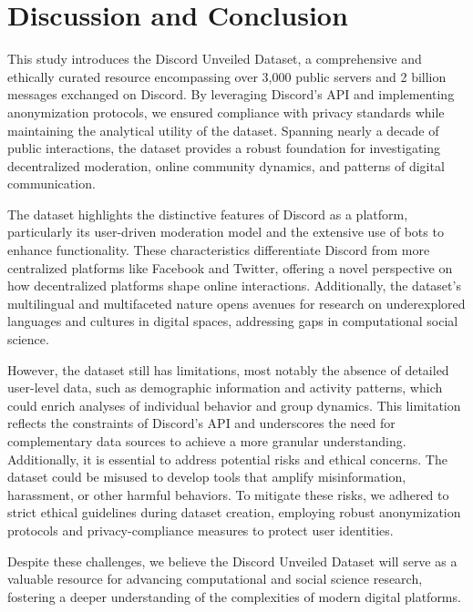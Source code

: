 \section{Discussion and Conclusion}

This study introduces the Discord Unveiled Dataset, a comprehensive and ethically curated resource encompassing over 3,000 public servers and 2 billion messages exchanged on Discord. By leveraging Discord's API and implementing anonymization protocols, we ensured compliance with privacy standards while maintaining the analytical utility of the dataset. Spanning nearly a decade of public interactions, the dataset provides a robust foundation for investigating decentralized moderation, online community dynamics, and patterns of digital communication.

The dataset highlights the distinctive features of Discord as a platform, particularly its user-driven moderation model and the extensive use of bots to enhance functionality. These characteristics differentiate Discord from more centralized platforms like Facebook and Twitter, offering a novel perspective on how decentralized platforms shape online interactions. Additionally, the dataset's multilingual and multifaceted nature opens avenues for research on underexplored languages and cultures in digital spaces, addressing gaps in computational social science. 

However, the dataset still has limitations, most notably the absence of detailed user-level data, such as demographic information and activity patterns, which could enrich analyses of individual behavior and group dynamics. This limitation reflects the constraints of Discord's API and underscores the need for complementary data sources to achieve a more granular understanding. Additionally, it is essential to address potential risks and ethical concerns. The dataset could be misused to develop tools that amplify misinformation, harassment, or other harmful behaviors. To mitigate these risks, we adhered to strict ethical guidelines during dataset creation, employing robust anonymization protocols and privacy-compliance measures to protect user identities. %

Despite these challenges, we believe the Discord Unveiled Dataset will serve as a valuable resource for advancing computational and social science research, fostering a deeper understanding of the complexities of modern digital platforms. %
